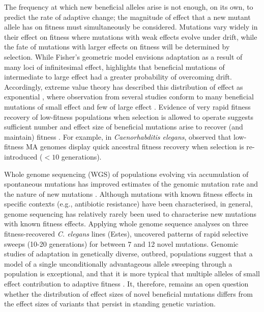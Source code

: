 The frequency at which new beneficial alleles arise is not enough, on its own, to predict the rate of adaptive change; the magnitude of effect that a new mutant allele has on fitness must simultaneously be considered. Mutations vary widely in their effect on fitness \citep{Eyre07, Wals18c10} where mutations with weak effects \citep[$s < 1/2N_e$, where $s$ is the selection coefficient and $N_e$ is the effective population size][]{Wrig31, Kimu83} evolve under drift, while the fate of mutations with larger effects on fitness will be determined by selection. While Fisher’s geometric model envisions adaptation as a result of many loci of infinitesimal effect, \citet{Kimu83} highlights that beneficial mutations of intermediate to large effect had a greater probability of overcoming drift. Accordingly, extreme value theory has described this distribution of effect as exponential \citep{Gill84, Orr03}, where observation from several studies conform to many beneficial mutations of small effect and few of large effect \citep{Imho01, Kass06, Burc07, Bata11}. Evidence of very rapid fitness recovery of low-fitness populations when selection is allowed to operate suggests sufficient number and effect size of beneficial mutations arise to recover (and maintain) fitness \citep{Burc99, Este03, Este11, Szam14}. For example, in \textit{Caenorhabditis elegans}, \citet{Este03} observed that low-fitness MA genomes display quick ancestral fitness recovery when selection is re-introduced ($< 10$ generations).\par

Whole genome sequencing (WGS) of populations evolving via accumulation of spontaneous mutations has improved estimates of the genomic mutation rate and the nature of new mutations \citep[reviewed by][]{Katj19}. Although mutations with known fitness effects in specific contexts (e.g., antibiotic resistance) have been characterised, in general, genome sequencing has relatively rarely been used to characterise new mutations with known fitness effects. Applying whole genome sequence analyses on three fitness-recovered \textit{C. elegans} lines (Estes), \citet{Denv10} uncovered patterns of rapid selective sweeps (10-20 generations) for between 7 and 12 novel mutations. Genomic studies of adaptation in genetically diverse, outbred, populations suggest that a model of a single unconditionally advantageous allele sweeping through a population is exceptional, and that it is more typical that multiple alleles of small effect contribution to adaptive fitness \citep{Prit10, Barg19}. It, therefore, remains an open question whether the distribution of effect sizes of novel beneficial mutations differs from the effect sizes of variants that persist in standing genetic variation. \par

